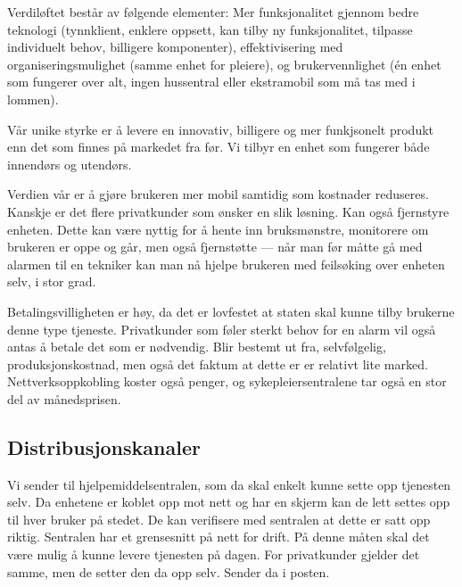 Verdiløftet består av følgende elementer: Mer funksjonalitet gjennom bedre
teknologi (tynnklient, enklere oppsett, kan tilby ny funksjonalitet, tilpasse
individuelt behov, billigere komponenter), effektivisering med
organiseringsmulighet (samme enhet for pleiere), og brukervennlighet (én enhet
som fungerer over alt, ingen hussentral eller ekstramobil som må tas med i
lommen).


Vår unike styrke er å levere en innovativ, billigere og mer funkjsonelt produkt
enn det som finnes på markedet fra før. Vi tilbyr en enhet som fungerer både
innendørs og utendørs.

Verdien vår er å gjøre brukeren mer mobil samtidig som kostnader reduseres.
Kanskje er det flere privatkunder som ønsker en slik løsning. Kan også
fjernstyre enheten. Dette kan være nyttig for å hente inn bruksmønstre,
monitorere om brukeren er oppe og går, men også fjernstøtte --- når man før
måtte gå med alarmen til en tekniker kan man nå hjelpe brukeren med feilsøking
over enheten selv, i stor grad.

Betalingsvilligheten er høy, da det er lovfestet at staten skal kunne tilby
brukerne denne type tjeneste. Privatkunder som føler sterkt behov for en alarm
vil også antas å betale det som er nødvendig. Blir bestemt ut fra,
selvfølgelig, produksjonskostnad, men også det faktum at dette er er relativt
lite marked. Nettverksoppkobling koster også penger, og sykepleiersentralene
tar også en stor del av månedsprisen.

\subsection{Distribusjonskanaler}



Vi sender til hjelpemiddelsentralen, som da skal enkelt kunne sette opp
tjenesten selv. Da enhetene er koblet opp mot nett og har en skjerm kan de lett
settes opp til hver bruker på stedet. De kan verifisere med sentralen at dette
er satt opp riktig. Sentralen har et grensesnitt på nett for drift. På denne
måten skal det være mulig å kunne levere tjenesten på dagen. For privatkunder
gjelder det samme, men de setter den da opp selv. Sender da i posten.

